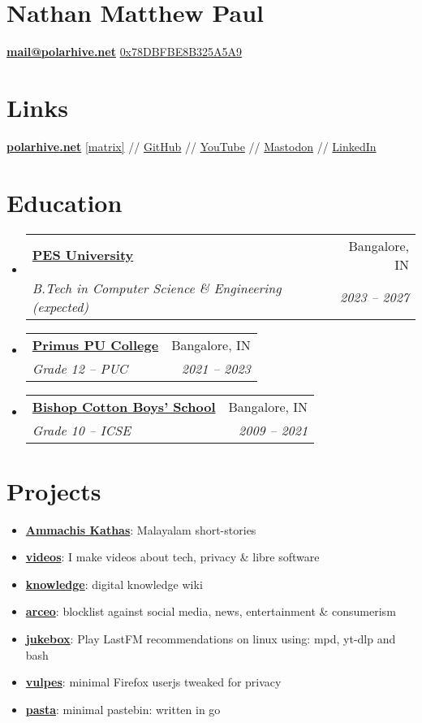 \documentclass[letterpaper, 11pt]{article}
\makeatletter
\newcommand{\resumeItem}[2]{
  \item\small{
    \textbf{#1}{: #2 \vspace{-2pt}}
  }
}
\newcommand{\resumeSubheading}[4]{
 \vspace{-1pt}\item
 \begin{tabular*}{0.97\textwidth}[t]{l@{\extracolsep{\fill}}r}
   \textbf{#1} & #2 \\
  \textit{\small#3} & \textit{\small #4} \\
 \end{tabular*}\vspace{-5pt}
}
\newcommand{\resumeSubItem}[2]{\resumeItem{#1}{#2}\vspace{-4pt}}
\newcommand{\resumeSubHeadingListStart}{\begin{itemize}[leftmargin=*]}
\newcommand{\resumeSubHeadingListEnd}{\end{itemize}}
\makeatother
\begin{document}
\section{\Huge {\textbf {Nathan Matthew Paul}}}
{\textbf{\href{mailto:mail@polarhive.net}{mail@polarhive.net}}}
\newline
{\href{https://polarhive.net/.well-known/polarhive_gpg.txt}{0x78DBFBE8B325A5A9}}

\section{Links}
{\textbf{\href{https://polarhive.net}{polarhive.net}}
\newline
{\href{https://matrix.to/#/@polarhive:matrix.org}{[matrix]}} //
{\href{https://github.com/polarhive}{GitHub}} //
{\href{https://youtube.com/polarhive}{YouTube}} //
{\href{https://mastodon.social/@polarhive}{Mastodon}} //
{\href{https://www.linkedin.com/in/polarhive}{LinkedIn}}

\section{Education}
  \resumeSubHeadingListStart
    \resumeSubheading
      {\href{https://pes.edu}{PES University}}{Bangalore, IN}
      {B.Tech in Computer Science \& Engineering (expected)} {2023 -- 2027}
    \resumeSubheading
      {\href{https://primuspucollege.edu.in}{Primus PU College}}{Bangalore, IN}
      {Grade 12 -- PUC}{2021 -- 2023}
    \resumeSubheading
      {\href{https://en.wikipedia.org/wiki/Bishop_Cotton_Boys'_School}{Bishop Cotton Boys' School}}{Bangalore, IN}
      {Grade 10 -- ICSE}{2009 -- 2021}
\resumeSubHeadingListEnd

\section{Projects}
  \resumeSubHeadingListStart
    \resumeSubItem{\href{https://polarhive.net/ammachiskathas}{Ammachis Kathas}}
      {Malayalam short-stories}
    \resumeSubItem{\href{https://polarhive.net/videos}{videos}}
      {I make videos about tech, privacy \& libre software}
    \resumeSubItem{\href{https://polarhive.net/knowledge}{knowledge}}
      {digital knowledge wiki}
    \resumeSubItem{\href{https://polarhive.net/arceo}{arceo}}
      {blocklist against social media, news, entertainment \& consumerism}
    \resumeSubItem{\href{https://polarhive.net/jukebox}{jukebox}}
      {Play LastFM recommendations on linux using: mpd, yt-dlp and bash}
    \resumeSubItem{\href{https://polarhive.net/vulpes}{vulpes}}
      {minimal Firefox userjs tweaked for privacy}
    \resumeSubItem{\href{https://polarhive.net/pasta}{pasta}}
      {minimal pastebin: written in go}
  \resumeSubHeadingListEnd

}
\end{document}
